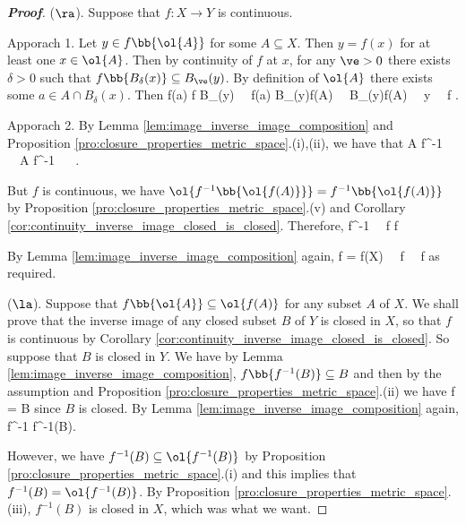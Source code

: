 \begin{proof}[\bf Proof]
($\ra$). Suppose that $f:X\to Y$ is continuous. 

Apporach 1. Let $y\in f\bb{\ol{A}}$ for some $A\subseteq X$. Then $y = f(x)$ for at least one $x\in \ol{A}$. Then by continuity of $f$ at $x$, for any $\ve>0$ there exists $\delta>0$ such that $f\bb{B_\delta(x)}\subseteq B_\ve(y)$. By definition of $\ol{A}$ there exists some $a\in A\cap B_\delta(x)$. Then 
\be
f(a) \in f \subseteq B_\ve(y) \ \ra\ f(a) \in B_\ve(y)\cap f(A) \ \ra\ B_\ve(y)\cap f(A) \neq \emptyset \ \ra\ y \in{} \ \ra\  f \subseteq {}.
\ee

Apporach 2. By Lemma \ref{lem:image_inverse_image_composition} and Proposition \ref{pro:closure_properties_metric_space}.(i),(ii), we have that
\be
A \subseteq f^{-1} \ \ra\ A \subseteq f^{-1} \ \ra\  \subseteq {}.
\ee

But $f$ is continuous, we have $\ol{f^{-1}\bb{\ol{f(A)}}} = f^{-1}\bb{\ol{f(A)}}$ by Proposition \ref{pro:closure_properties_metric_space}.(v) and Corollary \ref{cor:continuity_inverse_image_closed_is_closed}. Therefore,
\be
{} \subseteq f^{-1} \ \ra\ f \subseteq f 
\ee

By Lemma \ref{lem:image_inverse_image_composition} again,
\be
 f = \cap f(X) \ \ra\  f \subseteq {} \ \ra\ f \subseteq {}
\ee
as required. %

($\la$). Suppose that $f\bb{\ol{A}} \subseteq \ol{f(A)}$ for any subset $A$ of $X$. We shall prove that the inverse image of any closed subset $B$ of $Y$ is closed in $X$, so that $f$ is continuous by Corollary \ref{cor:continuity_inverse_image_closed_is_closed}. So suppose that $B$ is closed in $Y$. We have by Lemma \ref{lem:image_inverse_image_composition}, $f\bb{f^{-1}(B)} \subseteq B$ and then by the assumption and Proposition \ref{pro:closure_properties_metric_space}.(ii) we have
\be
f \subseteq {} \subseteq {} = B
\ee
since $B$ is closed. By Lemma \ref{lem:image_inverse_image_composition} again,
\be
{} \subseteq f^{-1} \subseteq f^{-1}(B).
\ee

However, we have $f^{-1}(B)\subseteq \ol{f^{-1}(B)}$ by Proposition \ref{pro:closure_properties_metric_space}.(i) and this implies that $f^{-1}(B)= \ol{f^{-1}(B)}$. By Proposition \ref{pro:closure_properties_metric_space}.(iii), $f^{-1}(B)$ is closed in $X$, which was what we want. 
\end{proof}


